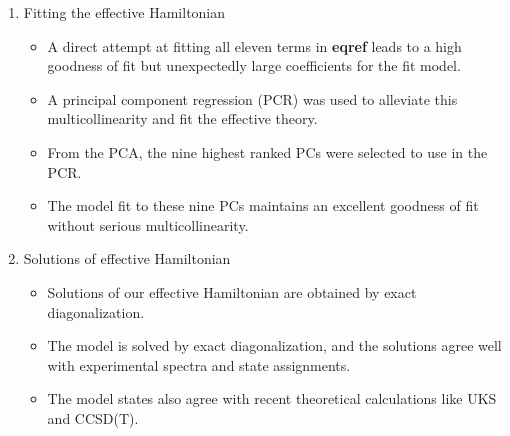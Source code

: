 \documentclass{article}
\begin{document}
\begin{enumerate}
\item Fitting the effective Hamiltonian 
\begin{itemize}
\item {A direct attempt at fitting all eleven terms in \textbf{eqref} leads to a high goodness of fit but unexpectedly large coefficients for the fit model.}

\item A principal component regression (PCR) was used to alleviate this multicollinearity and fit the effective theory.

\item From the PCA, the nine highest ranked PCs were selected to use in the PCR.

\item {The model fit to these nine PCs maintains an excellent goodness of fit without serious multicollinearity.}
\end{itemize}

\item Solutions of effective Hamiltonian
\begin{itemize}
\item Solutions of our effective Hamiltonian are obtained by exact diagonalization.

\item The model is solved by exact diagonalization, and the solutions
agree well with experimental spectra and state assignments.

\item The model states also agree with recent theoretical calculations like UKS and CCSD(T).
\end{itemize}
\end{enumerate}
\end{document}
